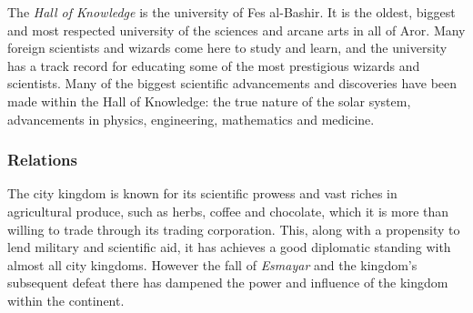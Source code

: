 The \emph{Hall of Knowledge} is the university of Fes al-Bashir. It is the
oldest, biggest and most respected university of the sciences and arcane arts
in all of Aror. Many foreign scientists and wizards come here to study and
learn, and the university has a track record for educating some of the most
prestigious wizards and scientists. Many of the biggest scientific
advancements and discoveries have been made within the Hall of Knowledge: the
true nature of the solar system, advancements in physics, engineering,
mathematics and medicine.

\subsubsection*{Relations}

The city kingdom is known for its scientific prowess and vast riches in
agricultural produce, such as herbs, coffee and chocolate, which it is more
than willing to trade through its trading corporation. This, along with a
propensity to lend military and scientific aid, it has achieves a good
diplomatic standing with almost all city kingdoms. However the fall of
\emph{Esmayar} and the kingdom's subsequent defeat there has dampened the
power and influence of the kingdom within the continent.
